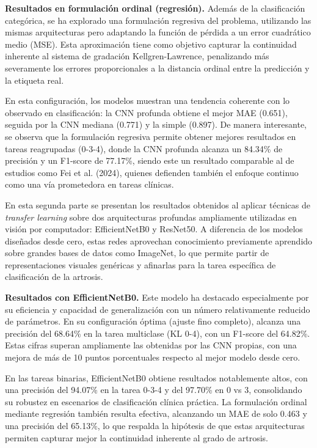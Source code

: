 \textbf{Resultados en formulación ordinal (regresión).}
Además de la clasificación categórica, se ha explorado una formulación regresiva del problema, utilizando las mismas arquitecturas pero adaptando la función de pérdida a un error cuadrático medio (MSE). Esta aproximación tiene como objetivo capturar la continuidad inherente al sistema de gradación Kellgren-Lawrence, penalizando más severamente los errores proporcionales a la distancia ordinal entre la predicción y la etiqueta real.

En esta configuración, los modelos muestran una tendencia coherente con lo observado en clasificación: la CNN profunda obtiene el mejor MAE (0.651), seguida por la CNN mediana (0.771) y la simple (0.897). De manera interesante, se observa que la formulación regresiva permite obtener mejores resultados en tareas reagrupadas (0-3-4), donde la CNN profunda alcanza un 84.34\% de precisión y un F1-score de 77.17\%, siendo este un resultado comparable al de estudios como Fei et al. (2024), quienes defienden también el enfoque continuo como una vía prometedora en tareas clínicas.

En esta segunda parte se presentan los resultados obtenidos al aplicar técnicas de \textit{transfer learning} sobre dos arquitecturas profundas ampliamente utilizadas en visión por computador: EfficientNetB0 y ResNet50. A diferencia de los modelos diseñados desde cero, estas redes aprovechan conocimiento previamente aprendido sobre grandes bases de datos como ImageNet, lo que permite partir de representaciones visuales genéricas y afinarlas para la tarea específica de clasificación de la artrosis.

\textbf{Resultados con EfficientNetB0.}
Este modelo ha destacado especialmente por su eficiencia y capacidad de generalización con un número relativamente reducido de parámetros. En su configuración óptima (ajuste fino completo), alcanza una precisión del 68.64\% en la tarea multiclase (KL 0-4), con un F1-score del 64.82\%. Estas cifras superan ampliamente las obtenidas por las CNN propias, con una mejora de más de 10 puntos porcentuales respecto al mejor modelo desde cero.

En las tareas binarias, EfficientNetB0 obtiene resultados notablemente altos, con una precisión del 94.07\% en la tarea 0-3-4 y del 97.70\% en 0 vs 3, consolidando su robustez en escenarios de clasificación clínica práctica. La formulación ordinal mediante regresión también resulta efectiva, alcanzando un MAE de solo 0.463 y una precisión del 65.13\%, lo que respalda la hipótesis de que estas arquitecturas permiten capturar mejor la continuidad inherente al grado de artrosis.

